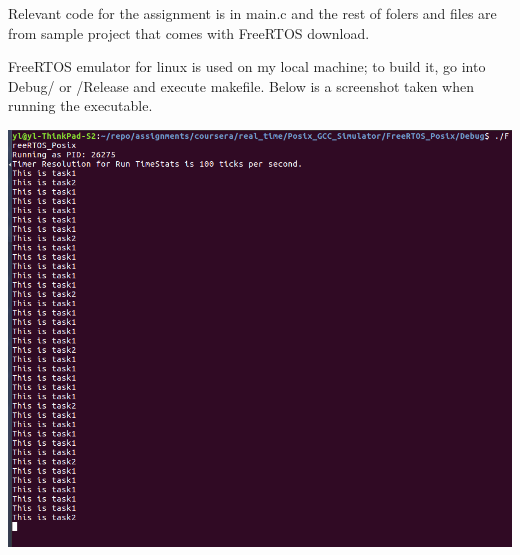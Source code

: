 \documentclass{article}
\begin{document}
Relevant code for the assignment is in main.c and the rest of folers and files are from sample project that comes with FreeRTOS download.

FreeRTOS emulator for linux is used on my local machine; to build it, go into Debug/ or /Release and execute makefile. Below is a screenshot taken when running the executable.

\includegraphics[width=1.6\textwidth,natwidth=922,natheight=762]{rtos_assignment_1_crop.png}
\end{document}
